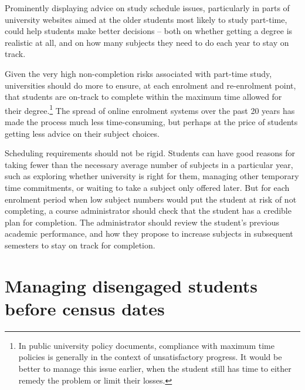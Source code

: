 Prominently displaying advice on study schedule issues, particularly in parts of university websites aimed at the older students most likely to study part-time, could help students make better decisions -- both on whether getting a degree is realistic at all, and on how many subjects they need to do each year to stay on track.

Given the very high non-completion risks associated with part-time study, universities should do more to ensure, at each enrolment and re-enrolment point, that students are on-track to complete within the maximum time allowed for their degree.\footnote{In public university policy documents, compliance with maximum time policies is generally in the context of unsatisfactory progress. It would be better to manage this issue earlier, when the student still has time to either remedy the problem or limit their losses.} The spread of online enrolment systems over the past 20 years has made the process much less time-consuming, but perhaps at the price of students getting less advice on their subject choices.

Scheduling requirements should not be rigid. Students can have good reasons for taking fewer than the necessary average number of subjects in a particular year, such as exploring whether university is right for them, managing other temporary time commitments, or waiting to take a subject only offered later. But for each enrolment period when low subject numbers would put the student at risk of not completing, a course administrator should check that the student has a credible plan for completion. The administrator should review the student's previous academic performance, and how they propose to increase subjects in subsequent semesters to stay on track for completion.

\section{Managing disengaged students before census dates}\label{sec:6.2}


